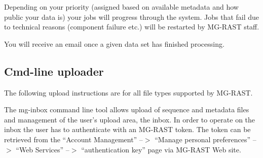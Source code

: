 \documentclass[12pt,fullpage]{report}
\begin{document}
Depending on your priority (assigned based on available metadata and how public your data is) your jobs will progress through the system. Jobs that fail due to technical reasons (component failure etc.) will be restarted by MG-RAST staff.

You will receive an email once a given data set has finished processing.


\subsection*{Cmd-line uploader}

The following upload instructions are for all file types supported by MG-RAST.

The mg-inbox command line tool allows upload of sequence and metadata files and management of the user’s upload area, the inbox. In order to operate on the inbox the user has to authenticate with an MG-RAST token. The token can be retrieved from the “Account Management” --$>$ “Manage personal preferences” --$>$ “Web Services” --$>$ “authentication key” page via MG-RAST Web site.
\end{document}
